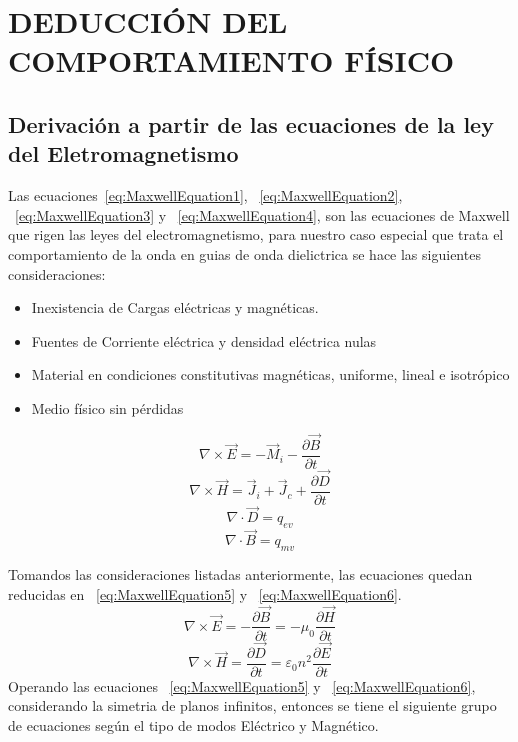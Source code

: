 \documentclass[letterpaper, 10 pt, conference]{ieeeconf}  %
\begin{document}
\section{DEDUCCI\'ON DEL COMPORTAMIENTO F\'ISICO}

\subsection{Derivaci\'on a partir de las ecuaciones de la ley del Eletromagnetismo}

Las ecuaciones~\eqref{eq:MaxwellEquation1}, ~\eqref{eq:MaxwellEquation2}, ~\eqref{eq:MaxwellEquation3} y ~\eqref{eq:MaxwellEquation4}, son las ecuaciones de Maxwell que rigen las leyes del electromagnetismo, para nuestro caso especial que trata el comportamiento de la onda en guias de onda dielictrica se hace las siguientes consideraciones: 
\begin{itemize}
  \item Inexistencia de Cargas el\'ectricas y magn\'eticas.
  \item Fuentes de Corriente el\'ectrica y densidad el\'ectrica nulas
  \item Material en condiciones constitutivas magn\'eticas, uniforme, lineal e isotr\'opico
  \item Medio f\'isico sin p\'erdidas
\end{itemize}
\begin{equation}
\label{eq:MaxwellEquation1}
{
\nabla  \times \vec E =  - {{\vec M}_i} - \frac{{\partial \vec B}}{{\partial t}}
}
\end{equation}
\begin{equation}
\label{eq:MaxwellEquation2}
{
\nabla  \times \vec H = {{\vec J}_i} + {{\vec J}_c} + \frac{{\partial \vec D}}{{\partial t}}
}
\end{equation}
\begin{equation}
\label{eq:MaxwellEquation3}
{
\nabla  \cdot \vec D = {q_{ev}}
}
\end{equation}
\begin{equation}
\label{eq:MaxwellEquation4}
{
\nabla  \cdot \vec B = {q_{mv}}
}
\end{equation}

Tomandos las consideraciones listadas anteriormente, las ecuaciones quedan reducidas en ~\eqref{eq:MaxwellEquation5} y ~\eqref{eq:MaxwellEquation6}.
\begin{equation}
\label{eq:MaxwellEquation5}
{
\nabla  \times \vec E =  - \frac{{\partial \vec B}}{{\partial t}} =  - {\mu _0}\frac{{\partial \vec H}}{{\partial t}}
}
\end{equation}
\begin{equation}
\label{eq:MaxwellEquation6}
{
\nabla  \times \vec H = \frac{{\partial \vec D}}{{\partial t}} = {\varepsilon _0}{n^2}\frac{{\partial \vec E}}{{\partial t}}
}
\end{equation}
Operando las ecuaciones ~\eqref{eq:MaxwellEquation5} y ~\eqref{eq:MaxwellEquation6}, considerando la simetria de planos infinitos, entonces se tiene el siguiente grupo de ecuaciones seg\'un el tipo de modos El\'ectrico y Magn\'etico.
\end{document}
